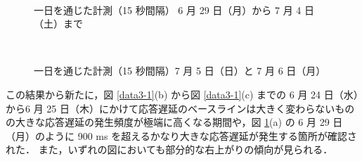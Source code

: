 \documentclass[a4j]{jarticle}
\begin{document}
\begin{figure}[tb]
\begin{center}
{}~
\caption{一日を通じた計測（15 秒間隔） 6 月 29 日（月）から 7 月 4 日（土）まで}
\label{data3}
\end{center}
\end{figure}
\begin{figure}[tb]
\begin{center}
~
\caption{一日を通じた計測（15 秒間隔）7 月 5 日（日）と 7 月 6 日（月）}
\label{data3-2}
\end{center}
\end{figure}
この結果から新たに，図 \ref{data3-1}(b) から図 \ref{data3-1}(c) までの 6 月 24 日（水）から6 月 25 日（木）にかけて応答遅延のベースラインは大きく変わらないものの大きな応答遅延の発生頻度が極端に高くなる期間や，図 \ref{data3}(a) の 6 月 29 日（月）のように 900 ms を超えるかなり大きな応答遅延が発生する箇所が確認された．
また，いずれの図においても部分的な右上がりの傾向が見られる．
\end{document}
